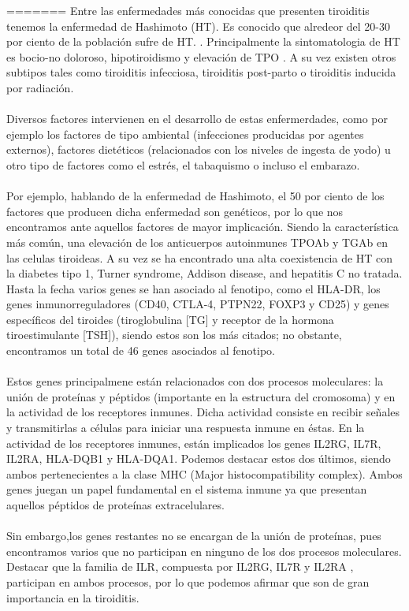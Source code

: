 \vspace{5mm}
=======
Entre las enfermedades más conocidas que presenten tiroiditis tenemos la enfermedad de Hashimoto (HT). Es conocido que alredeor del 20-30 por ciento de la población sufre de HT. \cite{Zheng2020}. Principalmente la sintomatologia de HT es bocio-no doloroso, hipotiroidismo y elevación de TPO \cite{Sweeney2014}. A su vez existen otros subtipos tales como tiroiditis infecciosa, tiroiditis post-parto o tiroiditis inducida por radiación. \cite{Sweeney2014}
\\ \\
 Diversos factores  intervienen en el desarrollo de estas enfermerdades, como por ejemplo los factores de tipo ambiental (infecciones producidas por agentes externos), factores dietéticos (relacionados con los niveles de ingesta de yodo) u otro tipo de factores como el estrés, el tabaquismo o incluso el embarazo. \cite{Hiromatsu}
\\  \\ 
 Por ejemplo, hablando de la enfermedad de Hashimoto, el 50 por ciento de los factores que producen dicha enfermedad son genéticos, por lo que nos encontramos ante aquellos factores de mayor implicación. Siendo la característica más común, una elevación de los anticuerpos autoinmunes TPOAb y TGAb en las celulas tiroideas.\cite{Zheng2020} A su vez se ha encontrado una alta coexistencia de HT con la diabetes tipo 1, Turner syndrome, Addison disease, and  hepatitis C no tratada.\cite{Sweeney2014}
\\ \newpage
Hasta la fecha varios genes se han asociado al fenotipo, como el HLA-DR, los genes inmunorreguladores (CD40, CTLA-4, PTPN22, FOXP3 y CD25) y genes específicos del tiroides (tiroglobulina [TG] y receptor de la hormona tiroestimulante [TSH]), siendo estos son los más citados; no obstante, encontramos un total de 46 genes asociados al fenotipo. 
\\ \\
Estos genes principalmene están relacionados con dos procesos moleculares: la unión de proteínas y péptidos (importante en la estructura del cromosoma) y en la actividad de los receptores inmunes. Dicha actividad consiste en recibir señales y transmitirlas a células para iniciar una respuesta inmune en éstas.
\cite{Hiromatsu}
En la actividad de los receptores inmunes, están implicados los genes IL2RG, IL7R, IL2RA, HLA-DQB1 y HLA-DQA1. Podemos destacar estos dos últimos, siendo ambos pertenecientes a la clase MHC (Major histocompatibility complex). Ambos genes juegan un papel fundamental en el sistema inmune ya que presentan aquellos péptidos de proteínas extracelulares. \cite{HLA} 
\\ \\
Sin embargo,los genes restantes no se encargan de la unión de proteínas, pues encontramos varios que no participan en ninguno de los dos procesos moleculares. Destacar que  la familia de ILR, compuesta por IL2RG, IL7R y IL2RA , participan en ambos procesos, por lo que podemos afirmar que son de gran importancia en la tiroiditis. 

